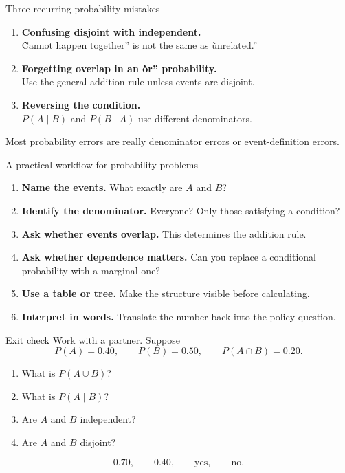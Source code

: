 \documentclass[11pt,aspectratio=169]{beamer}
\newcommand{\prob}[1]{P\!\left(#1\right)}
\newcommand{\condprob}[2]{P\!\left(#1\mid #2\right)}
\begin{document}
\begin{frame}{Three recurring probability mistakes}
\begin{enumerate}
  \item \textbf{Confusing disjoint with independent.}\\
  \`\`Cannot happen together'' is not the same as \`\`unrelated.''
  \item \textbf{Forgetting overlap in an \`\`or'' probability.}\\
  Use the general addition rule unless events are disjoint.
  \item \textbf{Reversing the condition.}\\
  $\condprob{A}{B}$ and $\condprob{B}{A}$ use different denominators.
\end{enumerate}

\vfill
\begin{center}
\Large Most probability errors are really \alert{denominator errors} or \alert{event-definition errors}.
\end{center}
\end{frame}

\begin{frame}{A practical workflow for probability problems}
\begin{enumerate}
  \item \textbf{Name the events.} What exactly are $A$ and $B$?
  \item \textbf{Identify the denominator.} Everyone? Only those satisfying a condition?
  \item \textbf{Ask whether events overlap.} This determines the addition rule.
  \item \textbf{Ask whether dependence matters.} Can you replace a conditional probability with a marginal one?
  \item \textbf{Use a table or tree.} Make the structure visible before calculating.
  \item \textbf{Interpret in words.} Translate the number back into the policy question.
\end{enumerate}
\end{frame}

\begin{frame}{Exit check}
Work with a partner. Suppose
\[
\prob{A}=0.40,\qquad \prob{B}=0.50,\qquad \prob{A\cap B}=0.20.
\]

\begin{enumerate}
  \item What is $\prob{A\cup B}$?
  \item What is $\condprob{A}{B}$?
  \item Are $A$ and $B$ independent?
  \item Are $A$ and $B$ disjoint?
\end{enumerate}

\vfill
\pause
\[
0.70,\qquad 0.40,\qquad \text{yes},\qquad \text{no}.
\]
\end{frame}
\end{document}
